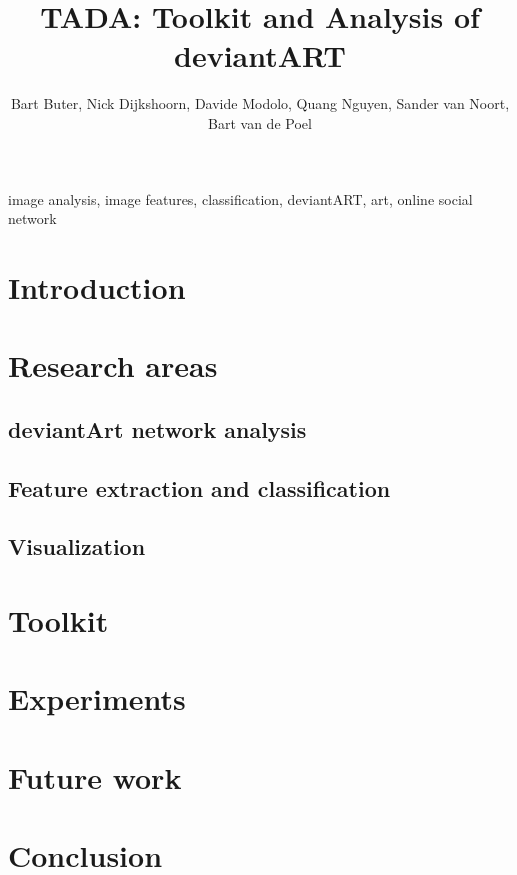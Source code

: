 \documentclass[10pt,journal,compsoc]{IEEEtran}
\begin{document}
\title{TADA: Toolkit and Analysis of deviantART}
\author{Bart Buter, Nick Dijkshoorn, Davide Modolo, Quang Nguyen, Sander van Noort, Bart van de Poel}

\maketitle

\begin{abstract}

\end{abstract}


\begin{keywords}
image analysis, image features, classification, deviantART, art, online social network
\end{keywords}


\section{Introduction \label{intro}}



\section{Research areas \label{research_area}}
	\subsection{deviantArt network analysis \label{net}}
	
	\subsection{Feature extraction and classification \label {feat_class}}
	
	\subsection{Visualization \label{visualiz}}
	


\section{Toolkit \label{toolkit}}


\section{Experiments \label{exp}}



\section{Future work \label{future_work}}


\section{Conclusion \label{conclusion}}


%




\pagebreak
\tableofcontents
\end{document}
